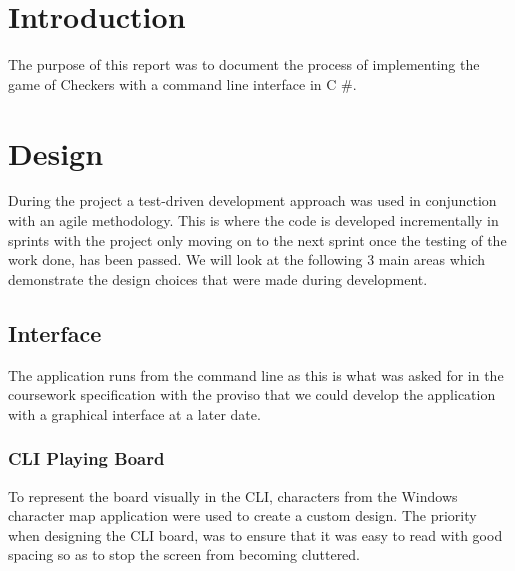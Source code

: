 \documentclass[10pt, a4paper]{article}
\title{\mytitle}
\author{\myauthor\hspace{1em}\\\contact\\Edinburgh Napier University\hspace{0.5em}-\hspace{0.5em}\mymodule}
\date{}
\begin{document}
	
    \maketitle  
    
    \begin{abstract}
    \end{abstract}


    
    
    
    \section{Introduction}
    The purpose of this report was to document the process of implementing the game of Checkers with a command line interface in C \#.
    
    
    
    
    \section{Design}
    
    During the project a test-driven development approach was used in conjunction with an agile methodology. This is where the code is developed incrementally in sprints with the project only moving on to the next sprint once the testing of the work done, has been passed. We will look at the following 3 main areas which demonstrate the design choices that were made during development.
    
    \subsection{Interface}
    The application runs from the command line as this is what was asked for in the coursework specification with the proviso that we could develop the application with a graphical interface at a later date.
    \subsubsection{CLI Playing Board}
    To represent the board visually in the CLI, characters from the Windows character map application were used to
    \newline 
    create a custom design. The priority when designing the CLI board, was to ensure that it was easy to read with good spacing so as to stop the screen from becoming cluttered. 
    
\end{document}
